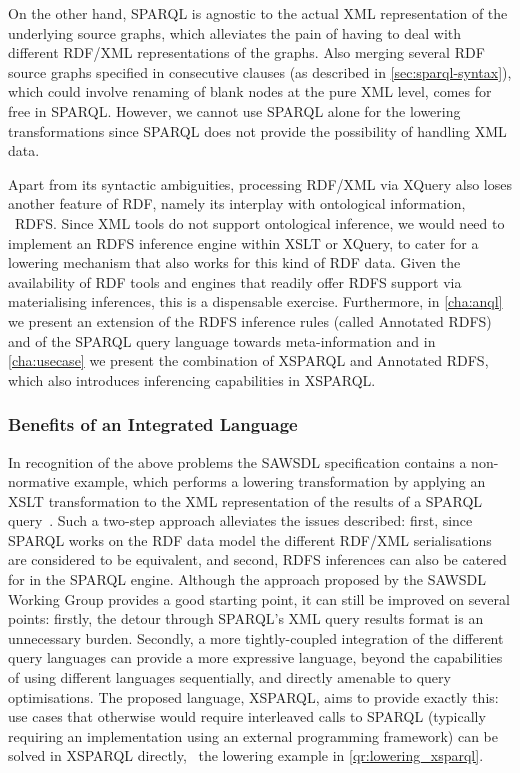 On the other hand, SPARQL is agnostic to the actual XML representation of the underlying source graphs, which alleviates
the pain of having to deal with different RDF/XML representations of the graphs. 
%
Also merging several RDF source graphs specified in consecutive \FROM clauses (as described in
\cref{sec:sparql-syntax}), which could involve renaming of blank nodes at the pure XML level, comes for free in SPARQL.
%
However, we cannot use SPARQL alone for the lowering transformations since SPARQL does not provide the possibility of
handling XML data.



Apart from its syntactic ambiguities, processing RDF/XML via XQuery also loses another feature of RDF, namely its
interplay with ontological information, \eg~\ac{RDFS}.
%
Since XML tools do not support ontological inference, we would need to implement an \ac{RDFS} inference engine within
\ac{XSLT} or XQuery, to cater for a lowering mechanism that also works for this kind of \ac{RDF} data. Given the
availability of \ac{RDF} tools and engines that readily offer \ac{RDFS} support via materialising inferences, this is a
dispensable exercise.  Furthermore, in \cref{cha:anql} we present an extension of the \ac{RDFS} inference rules (called
Annotated RDFS) and of the SPARQL query language towards meta-information and in \cref{cha:usecase} we present the
combination of XSPARQL and Annotated RDFS, which also introduces inferencing capabilities in XSPARQL.


\subsubsection*{Benefits of an Integrated Language}
%
In recognition of the above problems the \ac{SAWSDL} specification contains a non-normative example, which performs a
lowering transformation by applying an \ac{XSLT} transformation to the \ac{XML} representation of the results of a
SPARQL query~\cite{ClarkFeigenbaumTorres:2008aa}.
%
Such a two-step approach alleviates the issues described:
%
first, since SPARQL works on the RDF data model the different RDF/XML serialisations are considered to be equivalent,
and second, \ac{RDFS} inferences can also be catered for in the SPARQL engine.
%
Although the approach proposed by the \ac{SAWSDL} Working Group provides a good starting point, it can still be improved
on several points: firstly, the detour through SPARQL's XML query results format is an unnecessary burden.
%
Secondly, a more tightly-coupled integration of the different query languages can provide a more expressive language,
beyond the capabilities of using different languages sequentially, and directly amenable to query optimisations.
%
The proposed language, XSPARQL, aims to provide exactly this: use cases that otherwise would require interleaved calls
to SPARQL (typically requiring an implementation using an external programming framework) can be solved in XSPARQL
directly, \cf~the lowering example in \cref{qr:lowering_xsparql}.


